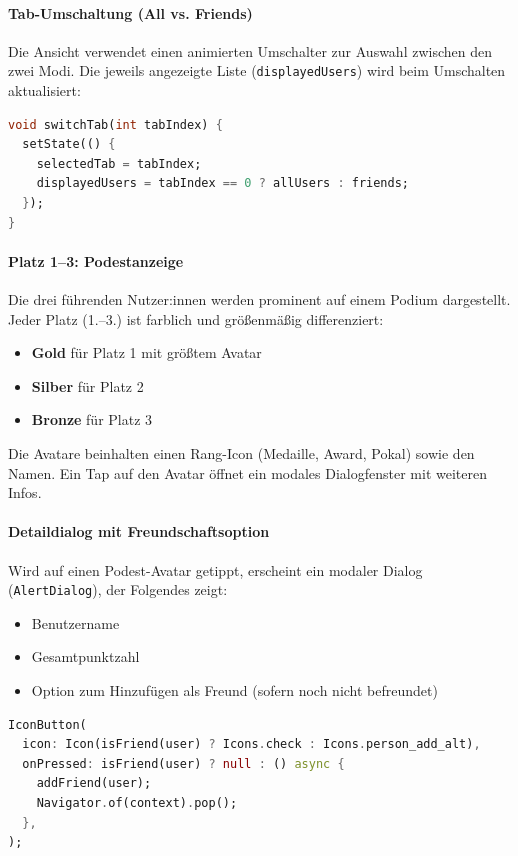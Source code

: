 \documentclass[11pt,a4paper]{article}
\begin{document}
\paragraph{Tab-Umschaltung (All vs. Friends)}
Die Ansicht verwendet einen animierten Umschalter zur Auswahl zwischen den zwei Modi. Die jeweils angezeigte Liste (\texttt{displayedUsers}) wird beim Umschalten aktualisiert:

\begin{lstlisting}[language=Dart, caption=Wechsel zwischen allen Nutzer:innen und Freund:innen]
void switchTab(int tabIndex) {
  setState(() {
    selectedTab = tabIndex;
    displayedUsers = tabIndex == 0 ? allUsers : friends;
  });
}
\end{lstlisting}

\paragraph{Platz 1–3: Podestanzeige}
Die drei führenden Nutzer:innen werden prominent auf einem Podium dargestellt. Jeder Platz (1.–3.) ist farblich und größenmäßig differenziert:
\begin{itemize}
    \item \textbf{Gold} für Platz 1 mit größtem Avatar
    \item \textbf{Silber} für Platz 2
    \item \textbf{Bronze} für Platz 3
\end{itemize}

Die Avatare beinhalten einen Rang-Icon (Medaille, Award, Pokal) sowie den Namen. Ein Tap auf den Avatar öffnet ein modales Dialogfenster mit weiteren Infos.

\paragraph{Detaildialog mit Freundschaftsoption}
Wird auf einen Podest-Avatar getippt, erscheint ein modaler Dialog (\texttt{AlertDialog}), der Folgendes zeigt:
\begin{itemize}
    \item Benutzername
    \item Gesamtpunktzahl
    \item Option zum Hinzufügen als Freund (sofern noch nicht befreundet)
\end{itemize}

\begin{lstlisting}[language=Dart, caption=Dialog zur Freundschaftsanfrage aus dem Podium]
IconButton(
  icon: Icon(isFriend(user) ? Icons.check : Icons.person_add_alt),
  onPressed: isFriend(user) ? null : () async {
    addFriend(user);
    Navigator.of(context).pop();
  },
);
\end{lstlisting}
\end{document}
